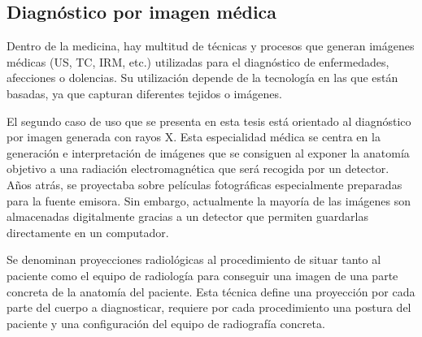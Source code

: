 \subsection{Diagnóstico por imagen médica}
\label{art:xraysim}

Dentro de la medicina, hay multitud de técnicas y procesos que generan imágenes médicas (\ac{US}, \ac{TC}, \ac{IRM}, etc.)  utilizadas para el diagnóstico de enfermedades, afecciones o dolencias. %
Su utilización depende de la tecnología en las que están basadas, ya que capturan diferentes tejidos o imágenes.

El segundo caso de uso que se presenta en esta tesis está orientado al diagnóstico por imagen generada con rayos X. Esta especialidad médica se centra en la generación e interpretación de imágenes que se consiguen al exponer la anatomía objetivo a una radiación electromagnética que será recogida por un detector. Años atrás, se proyectaba sobre películas fotográficas especialmente preparadas para la fuente emisora. Sin embargo, actualmente la mayoría de las imágenes son almacenadas digitalmente gracias a un detector que permiten guardarlas directamente en un computador.

Se denominan proyecciones radiológicas al procedimiento de situar tanto al paciente como el equipo de radiología para conseguir una imagen de una parte concreta de la anatomía del paciente. Esta técnica define una proyección por cada parte del cuerpo a diagnosticar, requiere por cada procedimiento una postura del paciente y una configuración del equipo de radiografía concreta.

